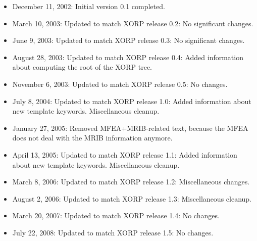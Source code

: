 \documentclass[11pt]{article}
\begin{document}
\begin{itemize}

  \item December 11, 2002: Initial version 0.1 completed.

  \item March 10, 2003: Updated to match XORP release 0.2:
   No significant changes.

  \item June 9, 2003: Updated to match XORP release 0.3:
   No significant changes.

  \item August 28, 2003: Updated to match XORP release 0.4:
   Added information about computing the root of the XORP tree.

  \item November 6, 2003: Updated to match XORP release 0.5:
   No changes.

  \item July 8, 2004: Updated to match XORP release 1.0:
   Added information about new template keywords. Miscellaneous cleanup.

  \item January 27, 2005: Removed MFEA+MRIB-related text, because the MFEA
   does not deal with the MRIB information anymore.

  \item April 13, 2005: Updated to match XORP release 1.1:
   Added information about new template keywords. Miscellaneous cleanup.

  \item March 8, 2006: Updated to match XORP release 1.2:
   Miscellaneous changes.

  \item August 2, 2006: Updated to match XORP release 1.3:
   Miscellaneous cleanup.

  \item March 20, 2007: Updated to match XORP release 1.4:
   No changes.

  \item July 22, 2008: Updated to match XORP release 1.5:
   No changes.

\end{itemize}




\end{document}
